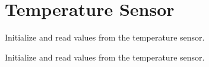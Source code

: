 \hypertarget{group__temperature}{\section{Temperature Sensor}
\label{group__temperature}
}


Initialize and read values from the temperature sensor.  


Initialize and read values from the temperature sensor. 
